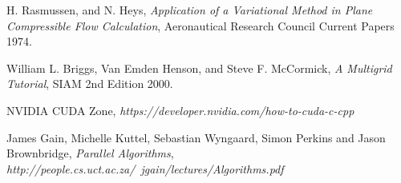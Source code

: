 \documentclass[a4paper]{report}
\begin{document}
\begin{thebibliography}{9}	

  		H. Rasmussen, and N. Heys,
  		\emph{Application of a Variational Method in Plane Compressible Flow Calculation},
  		Aeronautical Research Council Current Papers
  		1974.

  		William L. Briggs, Van Emden Henson, and Steve F. McCormick,
  		\emph{A Multigrid Tutorial},
  		SIAM
  		2nd Edition
  		2000.
  		
  		NVIDIA CUDA Zone,
  		\emph{https://developer.nvidia.com/how-to-cuda-c-cpp}
  		
  		James Gain, Michelle Kuttel, Sebastian Wyngaard,
Simon Perkins and Jason Brownbridge,
		\emph{Parallel Algorithms},
  		\emph{http://people.cs.uct.ac.za/~jgain/lectures/Algorithms.pdf}



\end{thebibliography}
\end{document}
